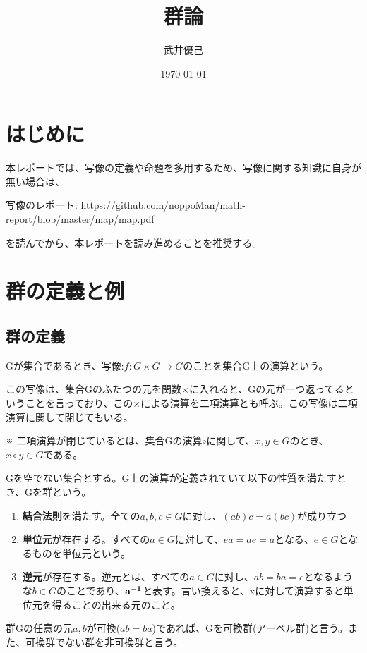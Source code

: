 \documentclass[dvipdfmx,autodetect-engine]{jsarticle}
\title{群論}
\author{武井優己}
\date{\today}
\begin{document}
\maketitle

\section{はじめに}

本レポートでは、写像の定義や命題を多用するため、写像に関する知識に自身が無い場合は、

写像のレポート: https://github.com/noppoMan/math-report/blob/master/map/map.pdf

を読んでから、本レポートを読み進めることを推奨する。

\section{群の定義と例}

\subsection{群の定義}

Gが集合であるとき、写像:$f: G \times G \to {} G$のことを集合G上の演算という。

この写像は、集合Gのふたつの元を関数$\times$に入れると、Gの元が一つ返ってるということを言っており、この$\times$による演算を二項演算とも呼ぶ。この写像は二項演算に関して閉じてもいる。

※ 二項演算が閉じているとは、集合Gの演算$\circ$に関して、$x, y \in G$のとき、$x \circ y \in G$である。

Gを空でない集合とする。G上の演算が定義されていて以下の性質を満たすとき、Gを群という。

\begin{enumerate}
\renewcommand{\labelenumi}{(\arabic{enumi})}
    \item {\bf 結合法則}を満たす。全ての$a, b, c \in G$に対し、$(ab)c = a(bc)$が成り立つ
	\item {\bf 単位元}が存在する。すべての$a \in G$に対して、$ea = ae = a$となる、$e \in G$となるものを単位元という。
	\item {\bf 逆元}が存在する。逆元とは、すべての$a \in G$に対し、$ab = ba = e$となるような$b \in G$のことであり、${\bf a^{-1} }$と表す。言い換えると、xに対して演算すると単位元を得ることの出来る元のこと。
\end{enumerate}

群Gの任意の元$a, b$が可換($ab = ba$)であれば、Gを可換群(アーベル群)と言う。また、可換群でない群を非可換群と言う。
\end{document}
